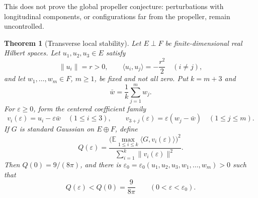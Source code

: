 \documentclass[11pt]{article}
\newtheorem{theorem}{Theorem}
\begin{document}
This does not prove the global propeller conjecture: perturbations with
longitudinal components, or configurations far from the propeller, remain
uncontrolled.

\begin{theorem}[Transverse local stability]\label{thm:main}
Let \(E\perp F\) be finite-dimensional real Hilbert spaces. Let
\(u_1,u_2,u_3\in E\) satisfy
\[
\|u_i\|=r>0,
\qquad
\langle u_i,u_j\rangle=-\frac{r^2}{2}\quad(i\ne j),
\]
and let \(w_1,\ldots,w_m\in F\), \(m\ge1\), be fixed and not all zero.
Put \(k=m+3\) and
\[
\bar w=\frac1k\sum_{j=1}^m w_j.
\]
For \(\varepsilon\ge0\), form the centered coefficient family
\[
v_i(\varepsilon)=u_i-\varepsilon\bar w\quad(1\le i\le3),
\qquad
v_{3+j}(\varepsilon)=\varepsilon(w_j-\bar w)
\quad(1\le j\le m).
\]
If \(G\) is standard Gaussian on \(E\oplus F\), define
\[
Q(\varepsilon)=
\frac{\bigl(\mathbb E\max_{1\le i\le k}
\langle G,v_i(\varepsilon)\rangle\bigr)^2}
{\sum_{i=1}^k\|v_i(\varepsilon)\|^2}.
\]
Then \(Q(0)=9/(8\pi)\), and there is
\(\varepsilon_0=\varepsilon_0(u_1,u_2,u_3,w_1,\ldots,w_m)>0\) such that
\[
Q(\varepsilon)<Q(0)=\frac{9}{8\pi}
\qquad(0<\varepsilon<\varepsilon_0).
\]
\end{theorem}
\end{document}
